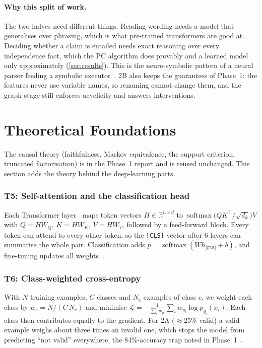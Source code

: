 \documentclass[12pt,a4paper]{article}
\newenvironment{theorybox}[1]{\subsubsection*{#1}}{}
\newcommand{\code}[1]{\texttt{#1}}
\begin{document}
\paragraph{Why this split of work.} The two halves need different things. Reading wording needs a model that generalises
over phrasing, which is what pre-trained transformers are good at. Deciding whether a claim is entailed needs exact
reasoning over every independence fact, which the PC algorithm does provably and a learned model only approximately
(\cref{sec:results}). This is the neuro-symbolic pattern of a neural parser feeding a symbolic executor~\cite{mao2019,garcez2023}.
2B also keeps the guarantees of Phase~1: the features never use variable names, so renaming cannot change them, and the graph
stage still enforces acyclicity and answers interventions.

\section{Theoretical Foundations}\label{sec:theory}

The causal theory (faithfulness, Markov equivalence, the support criterion, truncated factorisation) is in the Phase~1
report and is reused unchanged. This section adds the theory behind the deep-learning parts.

\begin{theorybox}{T5: Self-attention and the classification head}
Each Transformer layer~\cite{vaswani2017} maps token vectors $H\in\mathbb{R}^{n\times d}$ to
$\operatorname{softmax}\!\big(QK^\top/\sqrt{d_k}\big)V$ with $Q{=}HW_Q$, $K{=}HW_K$, $V{=}HW_V$, followed by a
feed-forward block. Every token can attend to every other token, so the \code{[CLS]} vector after 6 layers can summarise the
whole pair. Classification adds $p=\operatorname{softmax}(W h_{\code{[CLS]}}+b)$, and fine-tuning updates all weights~\cite{devlin2019}.
\end{theorybox}

\begin{theorybox}{T6: Class-weighted cross-entropy}
With $N$ training examples, $C$ classes and $N_c$ examples of class $c$, we weight each class by $w_c=N/(C\,N_c)$ and minimise
$\mathcal{L}=-\frac{1}{\sum_i w_{y_i}}\sum_i w_{y_i}\log p_{y_i}(x_i)$. Each class then contributes equally to the gradient.
For 2A ($\approx$25\% valid) a valid example weighs about three times an invalid one, which stops the model from
predicting ``not valid'' everywhere, the 84\%-accuracy trap noted in Phase~1~\cite{he2009}.
\end{theorybox}
\end{document}
